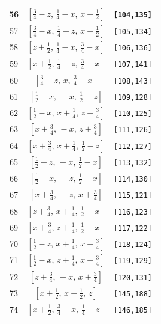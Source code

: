 \documentclass[fleqn,8pt]{jsarticle}
\begin{document}
\begin{longtable}{ccc}
56 & $\left[ \frac{3}{4} - z,\, \frac{1}{4} - x,\, x + \frac{1}{2} \right]$ & {\tt [104,135]} \\ \hline
57 & $\left[ \frac{3}{4} - x,\, \frac{1}{4} - z,\, x + \frac{1}{2} \right]$ & {\tt [105,134]} \\ \hline
58 & $\left[ z + \frac{1}{2},\, \frac{1}{4} - x,\, \frac{3}{4} - x \right]$ & {\tt [106,136]} \\ \hline
59 & $\left[ x + \frac{1}{2},\, \frac{1}{4} - z,\, \frac{3}{4} - x \right]$ & {\tt [107,141]} \\ \hline
60 & $\left[ \frac{3}{4} - z,\, x,\, \frac{3}{4} - x \right]$ & {\tt [108,143]} \\ \hline
61 & $\left[ \frac{1}{2} - x,\, - x,\, \frac{1}{2} - z \right]$ & {\tt [109,128]} \\ \hline
62 & $\left[ \frac{1}{2} - x,\, x + \frac{1}{4},\, z + \frac{3}{4} \right]$ & {\tt [110,125]} \\ \hline
63 & $\left[ x + \frac{3}{4},\, - x,\, z + \frac{3}{4} \right]$ & {\tt [111,126]} \\ \hline
64 & $\left[ x + \frac{3}{4},\, x + \frac{1}{4},\, \frac{1}{2} - z \right]$ & {\tt [112,127]} \\ \hline
65 & $\left[ \frac{1}{2} - z,\, - x,\, \frac{1}{2} - x \right]$ & {\tt [113,132]} \\ \hline
66 & $\left[ \frac{1}{2} - x,\, - z,\, \frac{1}{2} - x \right]$ & {\tt [114,130]} \\ \hline
67 & $\left[ x + \frac{3}{4},\, - z,\, x + \frac{3}{4} \right]$ & {\tt [115,121]} \\ \hline
68 & $\left[ z + \frac{3}{4},\, x + \frac{1}{4},\, \frac{1}{2} - x \right]$ & {\tt [116,123]} \\ \hline
69 & $\left[ x + \frac{3}{4},\, z + \frac{1}{4},\, \frac{1}{2} - x \right]$ & {\tt [117,122]} \\ \hline
70 & $\left[ \frac{1}{2} - z,\, x + \frac{1}{4},\, x + \frac{3}{4} \right]$ & {\tt [118,124]} \\ \hline
71 & $\left[ \frac{1}{2} - x,\, z + \frac{1}{4},\, x + \frac{3}{4} \right]$ & {\tt [119,129]} \\ \hline
72 & $\left[ z + \frac{3}{4},\, - x,\, x + \frac{3}{4} \right]$ & {\tt [120,131]} \\ \hline
73 & $\left[ x + \frac{1}{2},\, x + \frac{1}{2},\, z \right]$ & {\tt [145,188]} \\ \hline
74 & $\left[ x + \frac{1}{2},\, \frac{3}{4} - x,\, \frac{1}{4} - z \right]$ & {\tt [146,185]} \\ \hline

\end{longtable}
\end{document}
